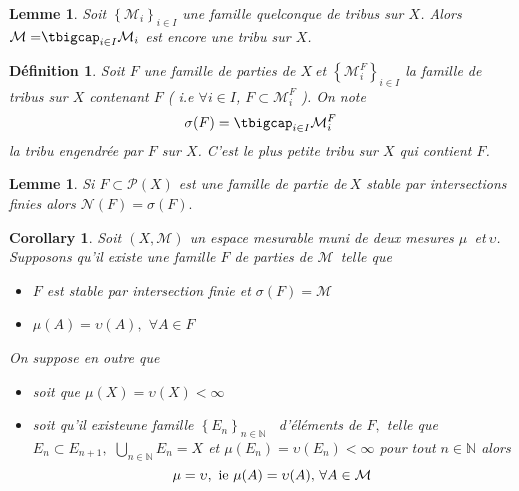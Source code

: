 \documentclass[3pt]{article}
\newtheorem{corollary}[theorem]{Corollary}
\newtheorem{definition}[theorem]{D\'{e}finition}
\newtheorem{lemma}[theorem]{Lemme}
\begin{document}
\bigskip

\begin{lemma}
Soit $\left\{ \mathcal{M}_{i}\right\} _{i\in I}$ une famille quelconque de
tribus sur $X$. Alors $\mathcal{M=}\tbigcap_{i\in I}\mathcal{M}_{i}$ est
encore une tribu sur $X$.
\end{lemma}

\bigskip

\begin{definition}
Soit $F$ une famille de parties de $X\ $et $\left\{ \mathcal{M}%
_{i}^{F}\right\} _{i\in I}$ la famille de tribus sur $X$ contenant $F$ ( i.e 
$\forall i\in I$, $F\subset \mathcal{M}_{i}^{F}$ ). On note 
\begin{equation*}
\sigma (F)=\tbigcap_{i\in I}\mathcal{M}_{i}^{F}
\end{equation*}%
la tribu engendr\'{e}e par $F$ sur $X$. C'est le plus petite tribu sur $X$
qui contient $F$.
\end{definition}

\bigskip

\begin{lemma}
Si $F\subset \mathcal{P}(X)$ est une famille de partie de$\ X$ stable par
intersections finies alors $\mathcal{N}(F)=\mathcal{\sigma }(F).$
\end{lemma}

\bigskip

\begin{corollary}
Soit $(X,\mathcal{M})$ un espace mesurable muni de deux mesures $\mu $\ et$\
\upsilon $. Supposons qu'il existe une famille $F$ de parties de $\mathcal{M}
$\ telle que

\begin{itemize}
\item $F$ est stable par intersection finie et $\sigma (F)=\mathcal{M}$

\item $\mu (A)=\upsilon (A),$ $\forall A\in F$
\end{itemize}

On suppose en outre que

\begin{itemize}
\item soit que $\mu (X)=\upsilon (X)<\infty $

\item soit qu'il existeune famille $\left\{ E_{n}\right\} _{n\in \mathbb{N}}$%
\ d'\'{e}l\'{e}ments de $F,$ telle que $E_{n}\subset E_{n+1},$ $%
\bigcup_{n\in \mathbb{N}}E_{n}=X$ et $\mu (E_{n})=\upsilon (E_{n})<\infty $
pour tout $n\in \mathbb{N}$ alors%
\begin{equation*}
\mu =\upsilon ,\text{ ie }\mu (A)=\upsilon (A)\text{, }\forall A\in \mathcal{%
M}
\end{equation*}
\end{itemize}
\end{corollary}
\end{document}
